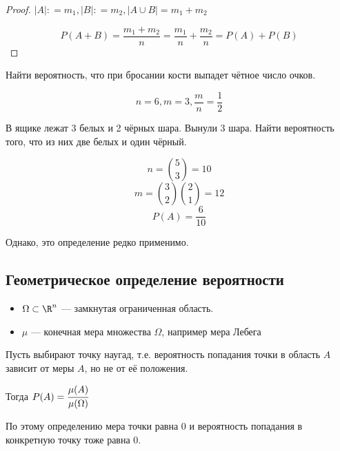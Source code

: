 \begin{proof}
    \(|A| : = m_1, |B| : = m_2, |A\cup B|= m_1 + m_2\)

    \[P(A + B) = \frac{m_1 + m_2}{n} = \frac{m_1}{n} + \frac{m_2}{n} = P(A) + P(B)\]
\end{proof}

\begin{example}
    Найти вероятность, что при бросании кости выпадет чётное число очков.

    \[n = 6, m = 3, \frac{m}{n} = \frac{1}{2}\]
\end{example}

\begin{example}
    В ящике лежат 3 белых и 2 чёрных шара. Вынули 3 шара. Найти вероятность того, что из них две белых и один чёрный.

    \[n = \binom{5}{3} = 10\]
    \[m = \binom{3}{2} \binom{2}{1} = 12\]
    \[P(A) = \frac{6}{10}\]
\end{example}

Однако, это определение редко применимо.

\subsection{Геометрическое определение вероятности}

\begin{definition}\itemfix
    \begin{itemize}
        \item \(\Omega \subset \R^n\) --- замкнутая ограниченная область.
        \item \(\mu\) --- конечная мера множества \(\Omega\), например мера Лебега
    \end{itemize}

    Пусть выбирают точку наугад, т.е. вероятность попадания точки в область \(A\) зависит от меры \(A\), но не от её положения.

    Тогда
    \(P(A) = \cfrac{\mu(A)}{\mu(\Omega)}\)
\end{definition}

\begin{remark}
    По этому определению мера точки равна \(0\) и вероятность попадания в конкретную точку тоже равна \(0\).
\end{remark}

